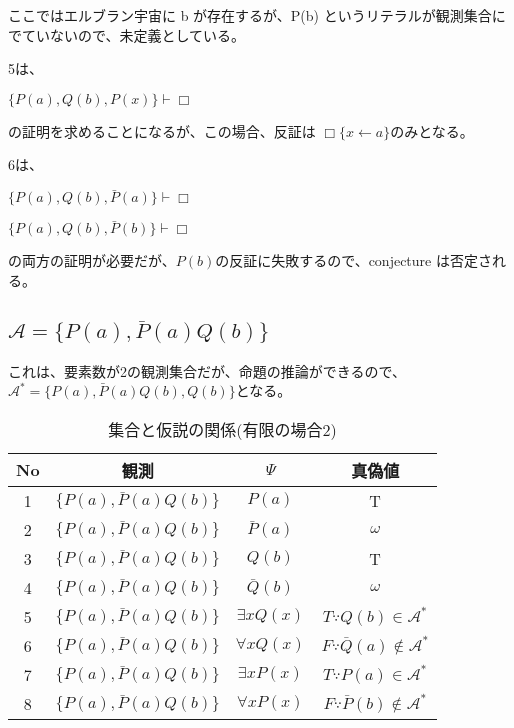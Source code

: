 \documentclass[10pt, oneside]{jarticle}   	%
\theoremstyle{definition}
\newcommand{\undet}{\omega}
\newcommand{\cont}{\Box}
\newcommand{\eset}[1]{\{{#1}\}}
\newcommand{\clos}[1]{\mathcal{#1}^{*}}
\begin{document}
ここではエルブラン宇宙に b が存在するが、P(b) というリテラルが観測集合にでていないので、未定義としている。

5は、

$\eset{P(a), Q(b), P(x)} \vdash \cont$ 

の証明を求めることになるが、この場合、反証は $\cont\{x \leftarrow a\}$のみとなる。

6は、

$\{P(a), Q(b), \bar P(a)\} \vdash \cont$

$\{P(a), Q(b), \bar P(b)\} \vdash \cont$

の両方の証明が必要だが、$P(b)$の反証に失敗するので、conjecture は否定される。


\subsection{$\mathcal{A}=\eset{P(a), \bar P(a)Q(b)}$}

これは、要素数が2の観測集合だが、命題の推論ができるので、$\clos{A}=\eset{P(a), \bar P(a)Q(b), Q(b)}$となる。

\begin{table}[htbp]
 \centering
 \begin{tabular}{|c|c|c|c|}\hline
   No & 観測 & $\Psi$ & 真偽値 \\ \hline
   1 & $\{P(a), \bar{P}(a)Q(b)\}$ & $P(a)$ & T \\ \hline
   2 & $\{P(a), \bar P(a)Q(b)\}$ & $\bar P(a)$ & $\undet$ \\ \hline %
   3 & $\{P(a), \bar P(a)Q(b)\}$ & $Q(b)$ & T \\ \hline
   4 & $\{P(a), \bar P(a)Q(b)\}$ & $\bar Q(b)$ & $\undet$ \\ \hline  %
   5 & $\{P(a), \bar P(a)Q(b)\}$ & $\exists x Q(x)$ & $T \because Q(b) \in \clos{A}$ \\ \hline
   6 & $\{P(a), \bar P(a)Q(b)\}$ & $\forall x Q(x)$ & $F \because  \bar Q(a) \notin \clos{A}$ \\ \hline
   7 & $\{P(a), \bar P(a)Q(b)\}$ & $\exists x P(x)$ & $T \because P(a) \in \clos{A}$ \\ \hline
   8 & $\{P(a), \bar P(a)Q(b)\}$ & $\forall x P(x)$ & $F \because \bar P(b) \notin \clos{A}$ \\ \hline
 \end{tabular}
 \caption{集合と仮説の関係(有限の場合2)}
 \label{tab:ex4}
\end{table}

\end{document}
